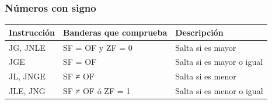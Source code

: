 \documentclass[12pt]{article}
\begin{document}
\subsubsection*{Números con signo}
\label{sec:org37c4a04}
\begin{center}
\begin{tabular}{|l|l|l|}
\hline
Instrucción & Banderas que comprueba & Descripción\\
\hline
JG, JNLE & SF = OF y ZF = 0 & Salta si es mayor\\
JGE & SF = OF & Salta si es mayor o igual\\
JL, JNGE & SF ≠ OF & Salta si es menor\\
JLE, JNG & SF ≠ OF ó ZF = 1 & Salta si es menor o igual\\
\hline
\end{tabular}
\end{center}
\end{document}
